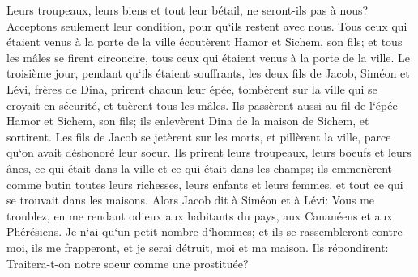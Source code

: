 \verse Leurs troupeaux, leurs biens et tout leur bétail, ne seront-ils pas à nous? Acceptons seulement leur condition, pour qu`ils restent avec nous. 
\verse Tous ceux qui étaient venus à la porte de la ville écoutèrent Hamor et Sichem, son fils; et tous les mâles se firent circoncire, tous ceux qui étaient venus à la porte de la ville. 
\verse Le troisième jour, pendant qu`ils étaient souffrants, les deux fils de Jacob, Siméon et Lévi, frères de Dina, prirent chacun leur épée, tombèrent sur la ville qui se croyait en sécurité, et tuèrent tous les mâles. 
\verse Ils passèrent aussi au fil de l`épée Hamor et Sichem, son fils; ils enlevèrent Dina de la maison de Sichem, et sortirent. 
\verse Les fils de Jacob se jetèrent sur les morts, et pillèrent la ville, parce qu`on avait déshonoré leur soeur. 
\verse Ils prirent leurs troupeaux, leurs boeufs et leurs ânes, ce qui était dans la ville et ce qui était dans les champs; 
\verse ils emmenèrent comme butin toutes leurs richesses, leurs enfants et leurs femmes, et tout ce qui se trouvait dans les maisons. 
\verse Alors Jacob dit à Siméon et à Lévi: Vous me troublez, en me rendant odieux aux habitants du pays, aux Cananéens et aux Phérésiens. Je n`ai qu`un petit nombre d`hommes; et ils se rassembleront contre moi, ils me frapperont, et je serai détruit, moi et ma maison. 
\verse Ils répondirent: Traitera-t-on notre soeur comme une prostituée? 

\chapter{}


